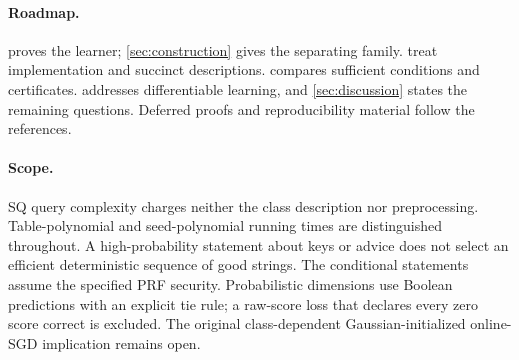 \paragraph{Roadmap.}
 proves the learner; \cref{sec:construction} gives the separating family.  treat implementation and succinct descriptions.  compares sufficient conditions and certificates.  addresses differentiable learning, and \cref{sec:discussion} states the remaining questions. Deferred proofs and reproducibility material follow the references.

\paragraph{Scope.}
SQ query complexity charges neither the class description nor preprocessing. Table-polynomial and seed-polynomial running times are distinguished throughout. A high-probability statement about keys or advice does not select an efficient deterministic sequence of good strings. The conditional statements assume the specified PRF security. Probabilistic dimensions use Boolean predictions with an explicit tie rule; a raw-score loss that declares every zero score correct is excluded. The original class-dependent Gaussian-initialized online-SGD implication remains open.
